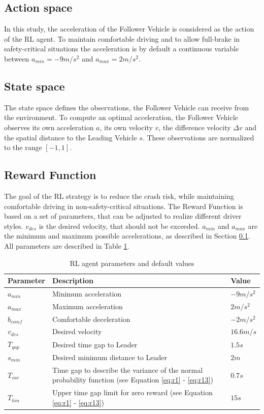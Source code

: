 \documentclass[review]{elsarticle}
\begin{document}
\subsection{Action space}
\label{actionSpace}
In this study, the acceleration of the Follower Vehicle is considered as the action of the RL agent. To maintain  comfortable driving and to allow full-brake in safety-critical situations the acceleration is by default a continuous variable between $a_{min} = -9m/s^2$ and $a_{max} = 2m/s^2$.


\subsection{State space}
The state space defines the observations, the Follower Vehicle can receive from the environment. To compute an optimal acceleration, the Follower Vehicle observes its own acceleration $a$, its own velocity $v$, the difference velocity $\Delta v$ and the spatial distance to the Leading Vehicle $s$. These observations are normalized to the range $[-1,1]$.


\subsection{Reward Function}
\label{rewardFunction}
The goal of the RL strategy is to reduce the crash risk, while maintaining comfortable driving in non-safety-critical situations. The Reward Function is based on a set of parameters, that can be adjusted to realize different driver styles. $v_{des}$ is the desired velocity, that should not be exceeded. $a_{min}$ and $a_{max}$ are the minimum and maximum possible accelerations, as described in Section \ref{actionSpace}. All parameters are described in Table \ref{tab:agentParameters}.

\begin{table}
\caption{RL agent parameters and default values} 
\label{tab:agentParameters} 
\begin{center}
\begin{tabular}{ p{}| p{}| p{}}
	Parameter & Description & Value \\ \hline
	$a_{min}$ & Minimum acceleration & $-9m/s^2$ \\  
	$a_{max}$ & Maximum acceleration & $2m/s^2$ \\  
	$b_{comf}$ & Comfortable deceleration & $-2m/s^2$ \\  
	$v_{des}$ & Desired velocity & $16.6 m/s$ \\  		
	$T_{gap}$ & Desired time gap to Leader & $1.5s$ \\
	$s_{min}$ & Desired minimum distance to Leader & $2m$ \\
	$T_{var}$ & Time gap to describe the variance of the normal probability function (see Equation \ref{eq:r1} - \ref{eq:r13}) & $0.7s$ \\
	$T_{lim}$ & Upper time gap limit for zero reward (see Equation \ref{eq:r1} - \ref{eq:r13}) & $15s$ 
\end{tabular}
\end{center}
\end{table}
\end{document}
